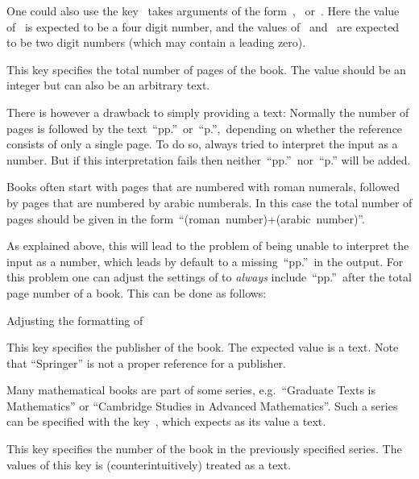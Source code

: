 \begin{refsection}
\begin{description}
    One could also use the key~ takes arguments of the form~,~ or~.
    Here the value of~ is expected to be a four digit number, and the values of~ and~ are expected to be two digit numbers (which may contain a leading zero).
  \item[\inlinecode{pagetotal}]
    This key specifies the total number of pages of the book.
    The value should be an integer but can also be an arbitrary text.

    There is however a drawback to simply providing a text:
    Normally the number of pages is followed by the text~\enquote{pp.}\ or~\enquote{p.},\ depending on whether the reference consists of only a single page.
    To do so,  always tried to interpret the input as a number.
    But if this interpretation fails then neither~\enquote{pp.}\ nor~\enquote{p.} will be added.

    Books often start with pages that are numbered with roman numerals, followed by pages that are numbered by arabic numberals.
    In this case the total number of pages should be given in the form~\enquote{(roman~number)+(arabic~number)}.

    As explained above, this will lead to the problem of  being unable to interpret the input as a number, which leads by default to a missing~\enquote{pp.}\ in the output.
    For this problem one can adjust the settings of  to \emph{always} include~\enquote{pp.}\ after the total page number of a book.
    This can be done as follows:
    \begin{showcode}{Adjusting the formatting of }
    \end{showcode}
  \item[\inlinecode{publisher}]
    This key specifies the publisher of the book.
    The expected value is a text.
    Note that \enquote{Springer} is not a proper reference for a publisher.
  \item[\inlinecode{series}]
    Many mathematical books are part of some series, e.g.\ \enquote{Graduate Texts is Mathematics} or \enquote{Cambridge Studies in Advanced Mathematics}.
    Such a series can be specified with the key~, which expects as its value a text.
  \item[\inlinecode{number}]
    This key specifies the number of the book in the previously specified series.
    The values of this key is (counterintuitively) treated as a text.
    

\end{description}
\end{refsection}
